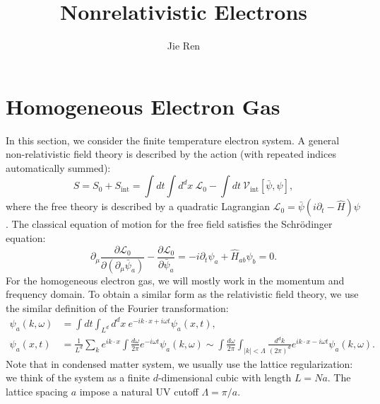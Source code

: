 \documentclass[aps,prb,superscriptaddress,nofootinbib]{revtex4}
\begin{document}
\title{Nonrelativistic Electrons}
\author{Jie Ren}



\maketitle

\tableofcontents



\section{Homogeneous Electron Gas}


In this section, we consider the finite temperature electron system.
A general non-relativistic field theory is described by the action (with repeated indices automatically summed):
\begin{equation}
	S = S_0 + S_{\mathrm{int}} = \int dt \int d^d x\ \mathcal{L}_0 - \int dt\ \mathcal{V}_{\mathrm{int}}[\bar\psi,\psi],
\end{equation}
where the free theory is described by a quadratic Lagrangian $\mathcal{L}_0 = \bar\psi (i\partial_t-\hat H)\psi$.
The classical equation of motion for the free field satisfies the Schr\"{o}dinger equation:
\begin{equation}
	\partial_\mu \frac{\partial \mathcal L_0}{\partial(\partial_\mu \bar\psi_a)} - \frac{\partial \mathcal L_0}{\partial\bar{\psi}_a} 
	= - i\partial_t \psi_a + \hat H_{ab}\psi_b = 0.
\end{equation}
For the homogeneous electron gas, we will mostly work in the momentum and frequency domain.
To obtain a similar form as the relativistic field theory, we use the similar definition of the Fourier transformation:
\begin{equation}
\begin{aligned}
	\psi_a(k,\omega) &= \int dt\int_{L^d} d^dx\ e^{-i k \cdot x+i\omega t}\psi_a(x,t), \\
	\psi_a(x,t) &= \frac{1}{L^d}\sum_{k} e^{i k \cdot x} \int \frac{d\omega}{2\pi} e^{-i\omega t} \psi_a(k,\omega) 
	\sim \int\frac{d\omega}{2\pi}\int_{|k|<\Lambda}\frac{d^d k}{(2\pi)^d} e^{i k \cdot x-i\omega t} \psi_a(k,\omega).
\end{aligned}
\end{equation}
Note that in condensed matter system, we usually use the lattice regularization: we think of the system as a finite $d$-dimensional cubic with length $L = N a$.
The lattice spacing $a$ impose a natural UV cutoff $\Lambda = \pi/a$.
\end{document}
